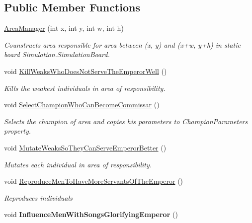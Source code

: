 \subsection*{Public Member Functions}
\begin{DoxyCompactItemize}
\item 
\hyperlink{class_music_population_1_1_area_manager_ac5549e56b610d304a84e5d27dc859e29}{Area\+Manager} (int x, int y, int w, int h)
\begin{DoxyCompactList}\small\item\em Counstructs area responsible for area between (x, y) and (x+w, y+h) in static board Simulation.\+Simulation\+Board. \end{DoxyCompactList}\item 
void \hyperlink{class_music_population_1_1_area_manager_aea2e8695966595f3319c3997e051c7fc}{Kill\+Weaks\+Who\+Does\+Not\+Serve\+The\+Emperor\+Well} ()
\begin{DoxyCompactList}\small\item\em Kills the weakest individuals in area of responsibility. \end{DoxyCompactList}\item 
void \hyperlink{class_music_population_1_1_area_manager_a1cd5bdd37af092d90006e0f4899fd29d}{Select\+Champion\+Who\+Can\+Become\+Commissar} ()
\begin{DoxyCompactList}\small\item\em Selects the champion of area and copies his parameters to Champion\+Parameters property. \end{DoxyCompactList}\item 
void \hyperlink{class_music_population_1_1_area_manager_a906954fb7f6be490564d5aacc950af89}{Mutate\+Weaks\+So\+They\+Can\+Serve\+Emperor\+Better} ()
\begin{DoxyCompactList}\small\item\em Mutates each individual in area of responsibility. \end{DoxyCompactList}\item 
void \hyperlink{class_music_population_1_1_area_manager_a02826d1f1271dd9a92dc11cc43eaaf2e}{Reproduce\+Men\+To\+Have\+More\+Servants\+Of\+The\+Emperor} ()
\begin{DoxyCompactList}\small\item\em Reproduces individuals \end{DoxyCompactList}\item 
\hypertarget{class_music_population_1_1_area_manager_a56fcf125c781dd2a2435bd0f91f42fb4}{void {\bfseries Influence\+Men\+With\+Songs\+Glorifying\+Emperor} ()}\label{class_music_population_1_1_area_manager_a56fcf125c781dd2a2435bd0f91f42fb4}


\end{DoxyCompactItemize}
